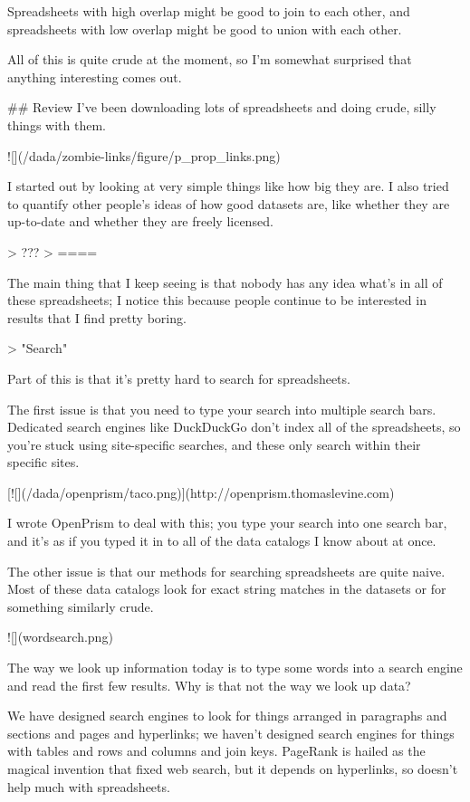 \documentclass{acm_proc_article-sp}
\begin{document}
Spreadsheets with high overlap might be good to join to each other, and
spreadsheets with low overlap might be good to union with each other.

All of this is quite crude at the moment, so I'm somewhat surprised that
anything interesting comes out.

## Review
I've been downloading lots of spreadsheets and doing crude, silly things
with them.

![](/dada/zombie-links/figure/p_prop_links.png)

I started out by looking at very simple things like how big they are.
I also tried to quantify other people's ideas of how good datasets are,
like whether they are up-to-date and whether they are freely licensed.

> ???
> ====

The main thing that I keep seeing is that nobody has any idea what's in all
of these spreadsheets; I notice this because people continue to be interested
in results that I find pretty boring.

> "Search"

Part of this is that it's pretty hard to search for spreadsheets.

The first issue is that you need to type your search into multiple search
bars. Dedicated search engines like DuckDuckGo don't index all of the
spreadsheets, so you're stuck using site-specific searches, and these only
search within their specific sites.

[![](/dada/openprism/taco.png)](http://openprism.thomaslevine.com)

I wrote OpenPrism to deal with this; you type your search into one search
bar, and it's as if you typed it in to all of the data catalogs I know about
at once.

The other issue is that our methods for searching spreadsheets are quite naive.
Most of these data catalogs look for exact string matches in the datasets or
for something similarly crude.

![](wordsearch.png)

The way we look up information today is to type some words into a search engine
and read the first few results. Why is that not the way we look up data?

We have designed search engines to look for things arranged in paragraphs
and sections and pages and hyperlinks; we haven't designed search engines for
things with tables and rows and columns and join keys.
PageRank is hailed as the magical invention that
fixed web search, but it depends on hyperlinks, so doesn't help much with spreadsheets.
\end{document}
